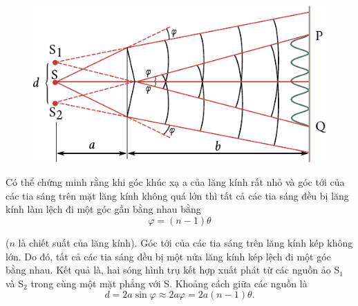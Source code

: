 \begin{figure}[!htb]
	\begin{center}
		\includegraphics[scale=0.98]{figures/ch_17/fig_17_9.pdf}
		\caption[]{}
		\label{fig:17_9}
	\end{center}
	\vspace{-0.9cm}
\end{figure}

Có thể chứng minh rằng khi góc khúc xạ a của lăng kính rất nhỏ và góc tới của các tia sáng trên mặt lăng kính không quá lớn thì tất cả các tia sáng đều bị lăng kính làm lệch đi một góc gần bằng nhau bằng
\begin{equation*}
    \varphi = (n - 1) \theta
\end{equation*}

\noindent
($n$ là chiết suất của lăng kính).
Góc tới của các tia sáng trên lăng kính kép không lớn.
Do đó, tất cả các tia sáng đều bị một nửa lăng kính kép lệch đi một góc bằng nhau.
Kết quả là, hai sóng hình trụ kết hợp xuất phát từ các nguồn ảo S$_1$ và S$_2$ trong cùng một mặt phẳng với S.
Khoảng cách giữa các nguồn là
\begin{equation*}
    d = 2a \sin\varphi \approx 2a\varphi = 2a (n - 1) \theta.
\end{equation*}

